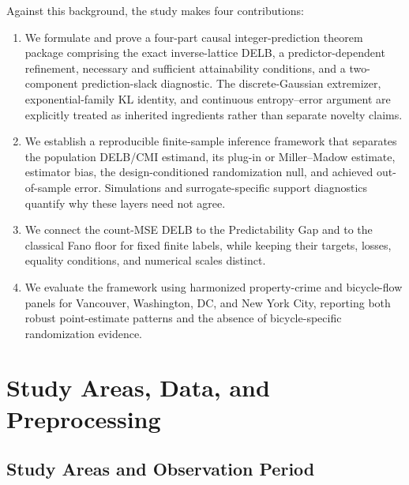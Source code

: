 \documentclass[applsci,article,submit,moreauthors]{Definitions/mdpi}
\begin{document}
Against this background, the study makes four contributions:
\begin{enumerate}
    \item We formulate and prove a four-part causal integer-prediction
    theorem package comprising the exact inverse-lattice DELB, a
    predictor-dependent refinement, necessary and sufficient attainability
    conditions, and a two-component prediction-slack diagnostic. The
    discrete-Gaussian extremizer, exponential-family KL identity, and
    continuous entropy--error argument are explicitly treated as inherited
    ingredients rather than separate novelty claims.
    \item We establish a reproducible finite-sample inference framework that
    separates the population DELB/CMI estimand, its plug-in or
    Miller--Madow estimate, estimator bias, the design-conditioned
    randomization null, and achieved out-of-sample error. Simulations and
    surrogate-specific support diagnostics quantify why these layers need
    not agree.
    \item We connect the count-MSE DELB to the Predictability Gap and to the
    classical Fano floor for fixed finite labels, while keeping their
    targets, losses, equality conditions, and numerical scales distinct.
    \item We evaluate the framework using harmonized property-crime and
    bicycle-flow panels for Vancouver, Washington, DC, and New York City,
    reporting both robust point-estimate patterns and the absence of
    bicycle-specific randomization evidence.
\end{enumerate}
\fi







\iffalse

\section{Study Areas, Data, and Preprocessing}
\label{sec:data}

\subsection{Study Areas and Observation Period}
\label{subsec:study_areas}
\end{document}
